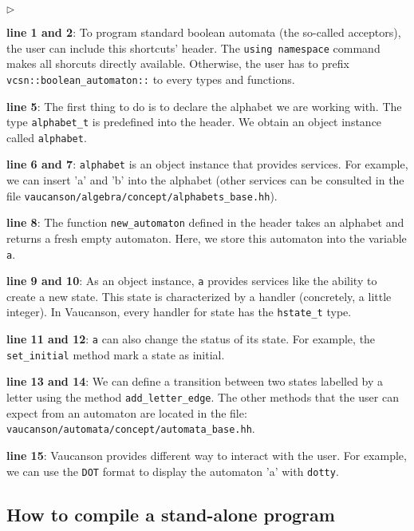 \documentclass{article}
\begin{document}
\begin{list}{$\triangleright$}{}
\item \textbf{line 1 and 2}: To program standard boolean automata (the
  so-called acceptors), the user can include this shortcuts' header.
  The \verb!using namespace! command makes all shorcuts directly
  available. Otherwise, the user has to prefix
  \verb!vcsn::boolean_automaton::! to every types and functions.
\item \textbf{line 5}: The first thing to do is to declare the
alphabet we are working with. The type \verb!alphabet_t! is predefined
into the header. We obtain an object instance called \verb!alphabet!.
\item \textbf{line 6 and 7}: \verb!alphabet! is an object instance
that provides services. For example, we can insert 'a' and 'b' into
the alphabet (other services can be consulted in the file 
\verb!vaucanson/algebra/concept/alphabets_base.hh!).
\item \textbf{line 8}: The function \verb!new_automaton! defined in
the header takes an alphabet and returns a fresh empty automaton. Here,
we store this automaton into the variable \verb!a!.
\item \textbf{line 9 and 10}: As an object instance, \verb!a! provides
services like the ability to create a new state. This state is
characterized by a handler (concretely, a little integer). In Vaucanson,
every handler for state has the \verb!hstate_t! type. 
\item \textbf{line 11 and 12}: \verb!a! can also change the status of
its state. For example, the \verb!set_initial! method mark a state as
initial. 
\item \textbf{line 13 and 14}: We can define a transition between two
states labelled by a letter using the method \verb!add_letter_edge!.
The other methods that the user can expect from an automaton are located in
the file: \verb!vaucanson/automata/concept/automata_base.hh!.
\item \textbf{line 15}: Vaucanson provides different way to interact
with the user. For example, we can use the \verb!DOT! format to
display the automaton 'a' with \verb!dotty!.
\end{list}

\subsection{How to compile a stand-alone program}
\end{document}
